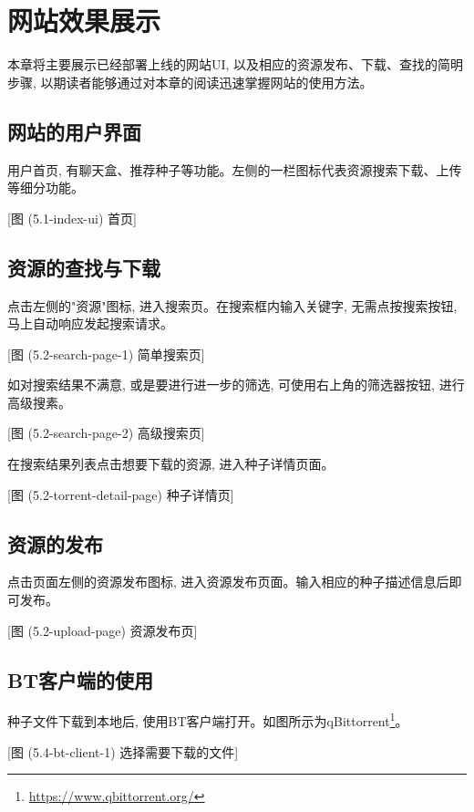 \chapter{网站效果展示}

本章将主要展示已经部署上线的网站UI, 以及相应的资源发布、下载、查找的简明步骤, 以期读者能够通过对本章的阅读迅速掌握网站的使用方法。

\section{网站的用户界面}

用户首页, 有聊天盒、推荐种子等功能。左侧的一栏图标代表资源搜索下载、上传等细分功能。

[图 (5.1-index-ui) 首页]

\section{资源的查找与下载}

点击左侧的"资源"图标, 进入搜索页。在搜索框内输入关键字, 无需点按搜索按钮, 马上自动响应发起搜索请求。

[图 (5.2-search-page-1) 简单搜索页]

如对搜索结果不满意, 或是要进行进一步的筛选, 可使用右上角的筛选器按钮, 进行高级搜素。

[图 (5.2-search-page-2) 高级搜索页]

在搜索结果列表点击想要下载的资源, 进入种子详情页面。

[图 (5.2-torrent-detail-page) 种子详情页]

\section{资源的发布}

点击页面左侧的资源发布图标, 进入资源发布页面。输入相应的种子描述信息后即可发布。

[图 (5.2-upload-page) 资源发布页]

\section{BT客户端的使用}

种子文件下载到本地后, 使用BT客户端打开。如图所示为qBittorrent\footnote{\url{https://www.qbittorrent.org/}}。

[图 (5.4-bt-client-1) 选择需要下载的文件]


